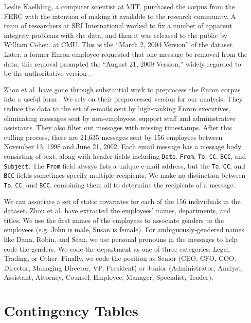\documentclass[aoas,preprint]{imsart}
\begin{document}
Leslie Kaelbling, a computer scientist at MIT, purchased the corpus from the FERC with the intention of making it available to the research community.  A team of researchers at SRI International worked to fix a number of apparent integrity problems with the data, and then it was released to the public by William Cohen, at CMU.  This is the ``March 2, 2004 Version'' of the dataset. Later, a former Enron employee requested that one message be removed from the data; this removal prompted the ``August 21, 2009 Version,'' widely regarded to be the authoritative version \cite{cohen2009enron}.

Zhou et al. have gone through substantial work to preprocess the Enron corpus into a useful form \cite{zhou2007strategies}.  We rely on their preprocessed version for our analysis.  They reduce the data to the set of e-mails sent by high-ranking Enron executives, eliminating messages sent by non-employees, support staff and administrative assistants.  They also filter out messages with missing timestamps.  After this culling process, there are 21,635 messages sent by 156 employees between November 13, 1998 and June 21, 2002.  Each email message has a message body consisting of text, along with header fields including \texttt{Date}, \texttt{From}, \texttt{To}, \texttt{CC}, \texttt{BCC}, and \texttt{Subject}.  The \texttt{From} field always lists a unique e-mail address, but the \texttt{To}, \texttt{CC}, and \texttt{BCC} fields sometimes specify multiple recipients.  We make no distinction between \texttt{To}, \texttt{CC}, and \texttt{BCC}, combining them all to determine the recipients of a message.

We can associate a set of static covariates for each of the 156 individuals in the dataset.  Zhou et al. have extracted the employees' names, departments, and titles.  We use the first names of the employees to associate genders to the employees (e.g, John is male, Susan is female).  For ambiguously-gendered names like Dana, Robin, and Sean, we use personal pronouns in the messages to help code the genders.  We code the department as one of three categories: Legal, Trading, or Other.  Finally, we code the position as Senior (CEO, CFO, COO, Director, Managing Director, VP, President) or Junior (Administrator, Analyst, Assistant, Attorney, Counsel, Employee, Manager, Specialist, Trader).


\section{Contingency Tables}
\end{document}
